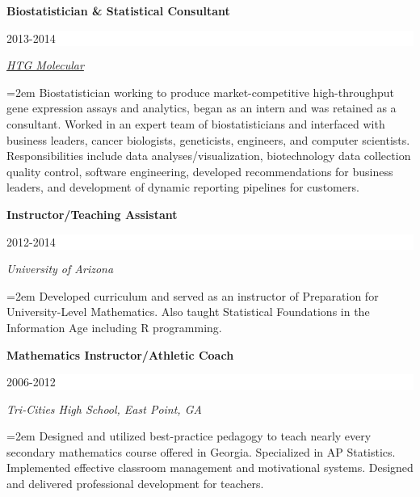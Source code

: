 \documentclass[paper=a4,fontsize=11pt]{scrartcl} %
\newcommand{\sepspace}{\vspace*{1em}}		%
\newcommand{\EducationEntry}[4]{
		\noindent \textbf{#1} \hfill      %
		\colorbox{White}{%
			\parbox{6em}{%
			\hfill\color{Black}#2}} \par  %
		\noindent \textit{#3} \par        %
		\noindent\hangindent=2em\hangafter=0 \small #4 %
		\normalsize \par \vspace{-7pt}}
\begin{document}
\EducationEntry{Biostatistician \& Statistical Consultant}{2013-2014}{{\href{https://www.htgmolecular.com/}{HTG Molecular}}}{Biostatistician working to produce market-competitive high-throughput gene expression assays and analytics, began as an intern and was retained as a consultant. Worked in an expert team of biostatisticians and interfaced with business leaders, cancer biologists, geneticists, engineers, and computer scientists. Responsibilities include data analyses/visualization, biotechnology data collection quality control, software engineering, developed recommendations for business leaders, and development of dynamic reporting pipelines for customers.}
\sepspace

\EducationEntry{Instructor/Teaching Assistant}{2012-2014}{University of Arizona}
{Developed curriculum and served as an instructor of Preparation for University-Level Mathematics. Also taught Statistical Foundations in the Information Age including \textsc{R} programming.}
\sepspace

\EducationEntry{Mathematics Instructor/Athletic Coach}{2006-2012}{Tri-Cities High School, East Point, GA}
{Designed and utilized best-practice pedagogy to teach nearly every secondary mathematics course offered in Georgia.  Specialized in AP Statistics. Implemented effective classroom management and motivational systems. Designed and delivered professional development for teachers.}

\end{document}

